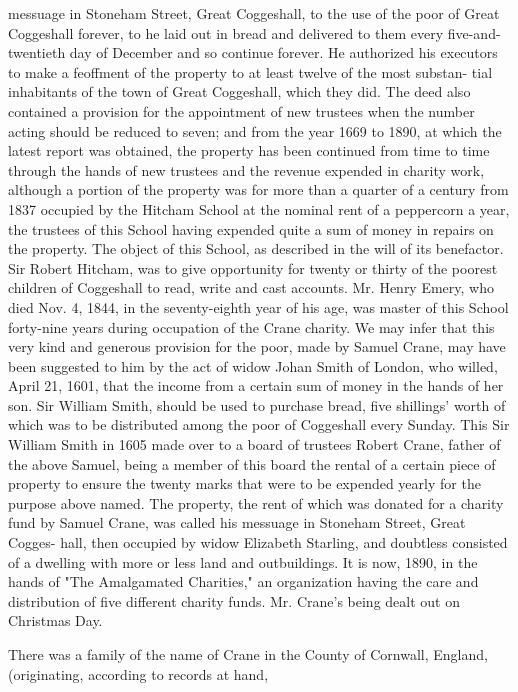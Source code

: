 \documentclass{book}
\begin{document}
messuage in Stoneham Street, Great Coggeshall, to the use of the 
poor of Great Coggeshall forever, to he laid out in bread and 
delivered to them every five-and-twentieth day of December and 
so continue forever. He authorized his executors to make a 
feoffment of the property to at least twelve of the most substan- 
tial inhabitants of the town of Great Coggeshall, which they did. 
The deed also contained a provision for the appointment of new 
trustees when the number acting should be reduced to seven; 
and from the year 1669 to 1890, at which the latest report was 
obtained, the property has been continued from time to time 
through the hands of new trustees and the revenue expended in 
charity work, although a portion of the property was for more 
than a quarter of a century from 1837 occupied by the Hitcham 
School at the nominal rent of a peppercorn a year, the trustees of 
this School having expended quite a sum of money in repairs on 
the property. The object of this School, as described in the will 
of its benefactor. Sir Robert Hitcham, was to give opportunity 
for twenty or thirty of the poorest children of Coggeshall to read, 
write and cast accounts. Mr. Henry Emery, who died Nov. 4, 
1844, in the seventy-eighth year of his age, was master of this 
School forty-nine years during occupation of the Crane charity. 
We may infer that this very kind and generous provision for the 
poor, made by Samuel Crane, may have been suggested to him 
by the act of widow Johan Smith of London, who willed, April 
21, 1601, that the income from a certain sum of money in the 
hands of her son. Sir William Smith, should be used to purchase 
bread, five shillings' worth of which was to be distributed among 
the poor of Coggeshall every Sunday. This Sir William Smith in 
1605 made over to a board of trustees  Robert Crane, father of 
the above Samuel, being a member of this board  the rental of a 
certain piece of property to ensure the twenty marks that were to 
be expended yearly for the purpose above named. The property, 
the rent of which was donated for a charity fund by Samuel 
Crane, was called his messuage in Stoneham Street, Great Cogges- 
hall, then occupied by widow Elizabeth Starling, and doubtless 
consisted of a dwelling with more or less land and outbuildings. 
It is now, 1890, in the hands of "The Amalgamated Charities," 
an organization having the care and distribution of five different 
charity funds. Mr. Crane's being dealt out on Christmas Day. 

There was a family of the name of Crane in the County of 
Cornwall, England, (originating, according to records at hand, 
\end{document}
